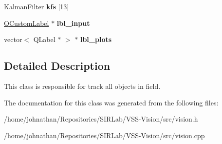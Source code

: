 \begin{DoxyCompactItemize}
\item 
Kalman\+Filter {\bfseries kfs} \mbox{[}13\mbox{]}\hypertarget{classvision_a76bf5d0bd645d4db2d9535bacae1284f}{}\label{classvision_a76bf5d0bd645d4db2d9535bacae1284f}

\item 
\hyperlink{classQCustomLabel}{Q\+Custom\+Label} $\ast$ {\bfseries lbl\+\_\+input}\hypertarget{classvision_ae925689fd0bd2eb2fcf2159e2f7b251e}{}\label{classvision_ae925689fd0bd2eb2fcf2159e2f7b251e}

\item 
vector$<$ Q\+Label $\ast$ $>$ $\ast$ {\bfseries lbl\+\_\+plots}\hypertarget{classvision_a4ec174995015376fcc9c15add83ed422}{}\label{classvision_a4ec174995015376fcc9c15add83ed422}

\end{DoxyCompactItemize}


\subsection{Detailed Description}
This class is responsible for track all objects in field. 

The documentation for this class was generated from the following files\+:\begin{DoxyCompactItemize}
\item 
/home/johnathan/\+Repositories/\+S\+I\+R\+Lab/\+V\+S\+S-\/\+Vision/src/vision.\+h\item 
/home/johnathan/\+Repositories/\+S\+I\+R\+Lab/\+V\+S\+S-\/\+Vision/src/vision.\+cpp\end{DoxyCompactItemize}
